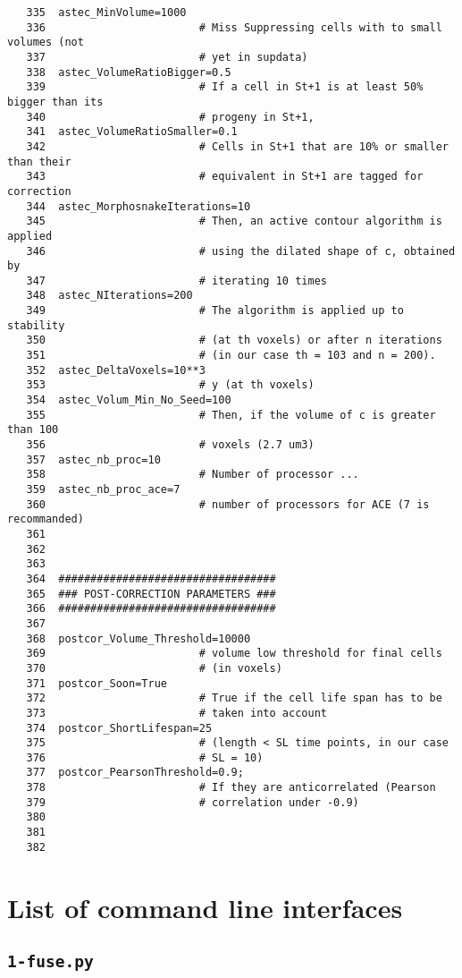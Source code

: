 \begin{verbatim}
   335	astec_MinVolume=1000 		
   336	                      # Miss Suppressing cells with to small volumes (not
   337						  # yet in supdata)
   338	astec_VolumeRatioBigger=0.5 
   339	                      # If a cell in St+1 is at least 50% bigger than its
   340						  # progeny in St+1, 
   341	astec_VolumeRatioSmaller=0.1
   342	                      # Cells in St+1 that are 10% or smaller than their
   343						  # equivalent in St+1 are tagged for correction
   344	astec_MorphosnakeIterations=10 
   345	                      # Then, an active contour algorithm is applied
   346					      # using the dilated shape of c, obtained by 
   347						  # iterating 10 times
   348	astec_NIterations=200 		
   349	                      # The algorithm is applied up to stability 
   350						  # (at th voxels) or after n iterations 
   351						  # (in our case th = 103 and n = 200). 
   352	astec_DeltaVoxels=10**3  	
   353	                      # y (at th voxels)
   354	astec_Volum_Min_No_Seed=100 
   355	                      # Then, if the volume of c is greater than 100 
   356						  # voxels (2.7 um3)
   357	astec_nb_proc=10 			
   358	                      # Number of processor ...
   359	astec_nb_proc_ace=7   		
   360	                      # number of processors for ACE (7 is recommanded)
   361	
   362	
   363	
   364	##################################
   365	### POST-CORRECTION PARAMETERS ###
   366	##################################
   367	
   368	postcor_Volume_Threshold=10000 	
   369	                      # volume low threshold for final cells 
   370						  # (in voxels) 
   371	postcor_Soon=True 				
   372	                      # True if the cell life span has to be 
   373						  # taken into account
   374	postcor_ShortLifespan=25 		
   375	                      # (length < SL time points, in our case 
   376						  # SL = 10)
   377	postcor_PearsonThreshold=0.9; 	
   378	                      # If they are anticorrelated (Pearson 
   379						  # correlation under -0.9)
   380	
   381	
   382	
\end{verbatim}


\section{List of command line interfaces}

\subsection{\texttt{1-fuse.py}}

